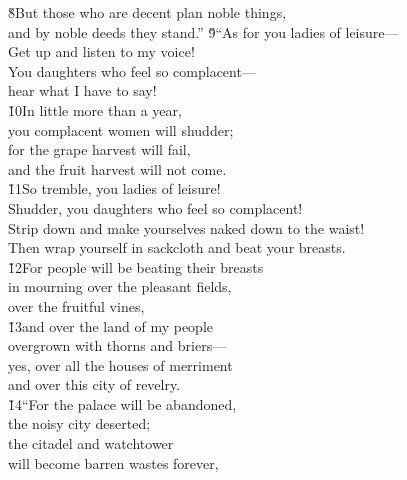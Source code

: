 \begin{poetry}
\poeml \v{8}But those who are decent plan noble things, \\
\poemll    and by noble deeds they stand.''
\poeml \v{9}``As for you ladies of leisure--- \\
\poemll    Get up and listen to my voice! \\
\poeml You daughters who feel so complacent--- \\
\poemll    hear what I have to say! \\
\poeml \v{10}In little more than a year, \\
\poemll    you complacent women will shudder; \\
\poeml for the grape harvest will fail, \\
\poemll    and the fruit harvest will not come. \\
\poeml \v{11}So tremble, you ladies of leisure! \\
\poemll    Shudder, you daughters who feel so complacent! \\
\poeml Strip down and make yourselves naked down to the waist! \\
\poemll    Then wrap yourself in sackcloth and beat your breasts. \\
\poeml \v{12}For people will be beating their breasts \\
\poemll    in mourning over the pleasant fields, \\
\poemlll       over the fruitful vines, \\
\poeml \v{13}and over the land of my people \\
\poemll    overgrown with thorns and briers--- \\
\poeml yes, over all the houses of merriment \\
\poemll    and over this city of revelry. \\
\poeml \v{14}``For the palace will be abandoned, \\
\poemll    the noisy city deserted; \\
\poeml the citadel and watchtower \\
\poemll    will become barren wastes forever, \\

\end{poetry}
